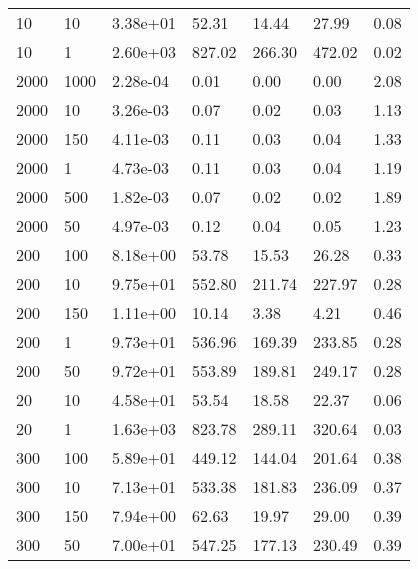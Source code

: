 \begin{table}
\begin{tabular}{lllllll}
10        &   10        &   3.38e+01  &   52.31     &   14.44     &   27.99     &   0.08      \\ 
10        &   1         &   2.60e+03  &   827.02    &   266.30    &   472.02    &   0.02      \\ 
2000      &   1000      &   2.28e-04  &   0.01      &   0.00      &   0.00      &   2.08      \\ 
2000      &   10        &   3.26e-03  &   0.07      &   0.02      &   0.03      &   1.13      \\ 
2000      &   150       &   4.11e-03  &   0.11      &   0.03      &   0.04      &   1.33      \\ 
2000      &   1         &   4.73e-03  &   0.11      &   0.03      &   0.04      &   1.19      \\ 
2000      &   500       &   1.82e-03  &   0.07      &   0.02      &   0.02      &   1.89      \\ 
2000      &   50        &   4.97e-03  &   0.12      &   0.04      &   0.05      &   1.23      \\ 
200       &   100       &   8.18e+00  &   53.78     &   15.53     &   26.28     &   0.33      \\ 
200       &   10        &   9.75e+01  &   552.80    &   211.74    &   227.97    &   0.28      \\ 
200       &   150       &   1.11e+00  &   10.14     &   3.38      &   4.21      &   0.46      \\ 
200       &   1         &   9.73e+01  &   536.96    &   169.39    &   233.85    &   0.28      \\ 
200       &   50        &   9.72e+01  &   553.89    &   189.81    &   249.17    &   0.28      \\ 
20        &   10        &   4.58e+01  &   53.54     &   18.58     &   22.37     &   0.06      \\ 
20        &   1         &   1.63e+03  &   823.78    &   289.11    &   320.64    &   0.03      \\ 
300       &   100       &   5.89e+01  &   449.12    &   144.04    &   201.64    &   0.38      \\ 
300       &   10        &   7.13e+01  &   533.38    &   181.83    &   236.09    &   0.37      \\ 
300       &   150       &   7.94e+00  &   62.63     &   19.97     &   29.00     &   0.39      \\ 
300       &   50        &   7.00e+01  &   547.25    &   177.13    &   230.49    &   0.39      \\ 

\end{tabular}
\end{table}
